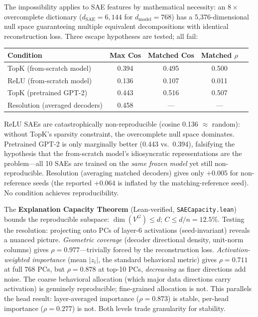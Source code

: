 \documentclass{jmlr}
\begin{document}
The impossibility applies to SAE features by mathematical necessity: an $8\times$ overcomplete dictionary ($d_{\text{SAE}}{=}6{,}144$ for $d_{\text{model}}{=}768$) has a 5{,}376-dimensional null space guaranteeing multiple equivalent decompositions with identical reconstruction loss. Three escape hypotheses are tested; all fail:

\begin{center}
\small
\begin{tabular}{@{}lcccc@{}}
\toprule
\textbf{Condition} & \textbf{Max Cos} & \textbf{Matched Cos} & \textbf{Matched $\rho$} \\
\midrule
TopK (from-scratch model) & 0.394 & 0.495 & 0.500 \\
ReLU (from-scratch model) & 0.136 & 0.107 & 0.011 \\
TopK (pretrained GPT-2) & 0.443 & 0.516 & 0.507 \\
Resolution (averaged decoders) & 0.458 & --- & --- \\
\bottomrule
\end{tabular}
\end{center}

ReLU SAEs are catastrophically non-reproducible (cosine 0.136 $\approx$ random): without TopK's sparsity constraint, the overcomplete null space dominates. Pretrained GPT-2 is only marginally better (0.443 vs.\ 0.394), falsifying the hypothesis that the from-scratch model's idiosyncratic representations are the problem---all 10 SAEs are trained on the \emph{same frozen model} yet still non-reproducible. Resolution (averaging matched decoders) gives only $+0.005$ for non-reference seeds (the reported $+0.064$ is inflated by the matching-reference seed). No condition achieves reproducibility.

The \textbf{Explanation Capacity Theorem} (Lean-verified, \texttt{SAECapacity.lean}) bounds the reproducible subspace: $\dim(V^G) \leq d$; $C \leq d/n = 12.5\%$. Testing the resolution: projecting onto PCs of layer-6 activations (seed-invariant) reveals a nuanced picture. \emph{Geometric coverage} (decoder directional density, unit-norm columns) gives $\rho = 0.977$---trivially forced by the reconstruction loss. \emph{Activation-weighted importance} (mean $|z_i|$, the standard behavioral metric) gives $\rho = 0.711$ at full 768 PCs, but $\rho = 0.878$ at top-10 PCs, \emph{decreasing} as finer directions add noise. The coarse behavioral allocation (which major data directions carry activation) is genuinely reproducible; fine-grained allocation is not. This parallels the head result: layer-averaged importance ($\rho = 0.873$) is stable, per-head importance ($\rho = 0.277$) is not. Both levels trade granularity for stability.
\end{document}
